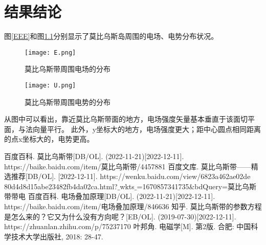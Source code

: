
\chapter{结果结论}
图\ref{EEE}和图\ref{UUU}分别显示了莫比乌斯岛周围的电场、电势分布状况。
\begin{figure}[h]
  \centering
  \texttt{[image: E.png]}
  \caption{莫比乌斯带周围电场的分布}\label{EEE}
  \texttt{[image: U.png]}
  \caption{莫比乌斯带周围电势的分布}\label{UUU}
\end{figure}

从图中可以看出，靠近莫比乌斯带面的地方，电场强度矢量基本垂直于该面切平面，与法向量平行。
此外，y坐标大的地方，电场强度更大；距中心圆点相同距离的点x坐标大的，电势更高。
\newpage
\begin{thebibliography}{4}%
    百度百科. 莫比乌斯带[DB/OL]. (2022-11-21)[2022-12-11]. https://baike.baidu.com/item/莫比乌斯带/4457881
    百度文库. 莫比乌斯带——精选推荐[DB/OL]. [2022-12-11]. https://wenku.baidu.com/view/6823a462ae02de\\80d4d8d15abe23482fb4da02ca.html?$\_$wkts$\_$=1670857341735\&bdQuery=莫比乌斯带带电
    百度百科. 电场叠加原理[DB/OL]. (2022-11-21)[2022-12-11]. https://baike.baidu.com/item/电场叠加原理/846636
    知乎. 莫比乌斯带的参数方程是怎么来的？它又为什么没有方向呢？[EB/OL]. (2019-07-30)[2022-12-11]. https://zhuanlan.zhihu.com/p/75237170
    叶邦角. 电磁学[M]. 第2版. 合肥: 中国科学技术大学出版社, 2018: 28-47.
\end{thebibliography}